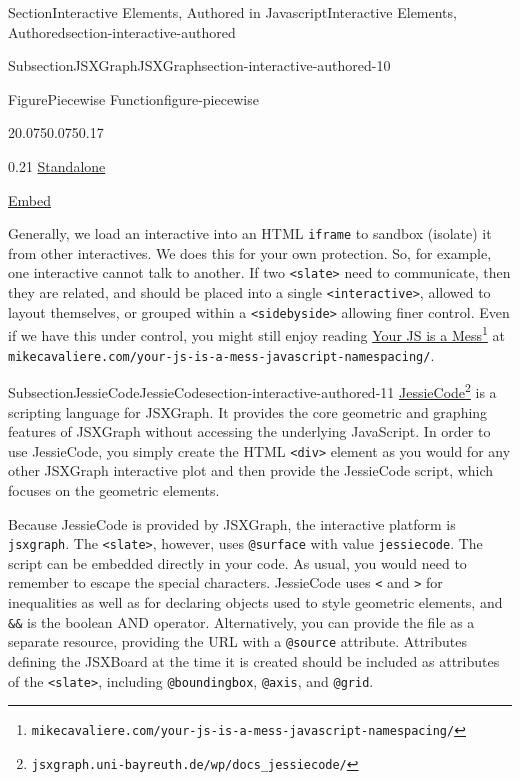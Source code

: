 \documentclass[twoside,10pt,]{article}
\newcommand{\mono}[1]{\texttt{#1}}
\numberwithin{equation}{section}
\begin{document}
\begin{sectionptx}{Section}{Interactive Elements, Authored in Javascript}{}{Interactive Elements, Authored}{}{}{section-interactive-authored}
\begin{subsectionptx}{Subsection}{JSXGraph}{}{JSXGraph}{}{}{section-interactive-authored-10}
\begin{figureptx}{Figure}{Piecewise Function}{figure-piecewise}{}
\begin{sidebyside}{2}{0.075}{0.075}{0.17}
\begin{sbspanel}{0.21}
\href{https://pretextbook.org/examples/sample-article/html/interactive-piecewise.html}{Standalone}%
\par
\href{https://pretextbook.org/examples/sample-article/html/interactive-piecewise-if.html}{Embed}%
\end{sbspanel}%
\end{sidebyside}%
\tcblower
\end{figureptx}%
Generally, we load an interactive into an HTML \mono{iframe} to sandbox (isolate) it from other interactives.  We does this for your own protection.  So, for example, one interactive cannot talk to another.  If two \mono{<slate>} need to communicate, then they are related, and should be placed into a single \mono{<interactive>}, allowed to layout themselves, or grouped within a \mono{<sidebyside>} allowing finer control.  Even if we have this under control, you might still enjoy reading \href{http://mikecavaliere.com/your-js-is-a-mess-javascript-namespacing/}{Your JS is a Mess}\footnote{\nolinkurl{mikecavaliere.com/your-js-is-a-mess-javascript-namespacing/}\label{section-interactive-authored-10-16-6}} at \mono{mikecavaliere.com/your-js-is-a-mess-javascript-namespacing/}.%
\end{subsectionptx}
%
%
\typeout{************************************************}
\typeout{************************************************}
%
\begin{subsectionptx}{Subsection}{JessieCode}{}{JessieCode}{}{}{section-interactive-authored-11}
%
\href{https://jsxgraph.uni-bayreuth.de/wp/docs_jessiecode/}{JessieCode}\footnote{\nolinkurl{jsxgraph.uni-bayreuth.de/wp/docs_jessiecode/}\label{section-interactive-authored-11-3-2}} is a scripting language for JSXGraph. It provides the core geometric and graphing features of JSXGraph without accessing the underlying JavaScript. In order to use JessieCode, you simply create the HTML \mono{<div>} element as you would for any other JSXGraph interactive plot and then provide the JessieCode script, which focuses on the geometric elements.%
\par
Because JessieCode is provided by JSXGraph, the interactive platform is \mono{jsxgraph}. The \mono{<slate>}, however, uses \mono{@surface} with value \mono{jessiecode}. The script can be embedded directly in your code. As usual, you would need to remember to escape the special characters. JessieCode uses \mono{<} and \mono{>} for inequalities as well as for declaring objects used to style geometric elements, and \mono{\&\&} is the boolean AND operator. Alternatively, you can provide the file as a separate resource, providing the URL with a \mono{@source} attribute. Attributes defining the JSXBoard at the time it is created should be included as attributes of the \mono{<slate>}, including \mono{@boundingbox}, \mono{@axis}, and \mono{@grid}.%

\end{subsectionptx}
\end{sectionptx}
\end{document}
